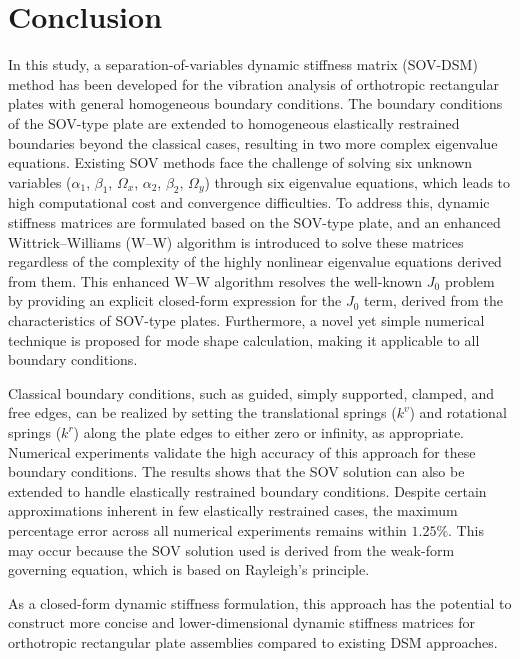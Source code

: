 \documentclass[preprint,12pt,number]{elsarticle}
\begin{document}
\section{Conclusion}\label{sec:coclusion}
In this study, a separation-of-variables dynamic stiffness matrix (SOV-DSM) method has been developed for the vibration analysis of orthotropic rectangular plates with general homogeneous boundary conditions. 
The boundary conditions of the SOV-type plate are extended to homogeneous elastically restrained boundaries beyond the classical cases, resulting in two more complex eigenvalue equations. 
Existing SOV methods face the challenge of solving six unknown variables ($\alpha_1$, $\beta_1$, $\Omega_x$, $\alpha_2$, $\beta_2$, $\Omega_y$) through six eigenvalue equations, which leads to high computational cost and convergence difficulties. 
To address this, dynamic stiffness matrices are formulated based on the SOV-type plate, and an enhanced Wittrick–Williams (W–W) algorithm is introduced to solve these matrices regardless of the complexity of the highly nonlinear eigenvalue equations derived from them. 
This enhanced W–W algorithm resolves the well-known $J_0$ problem by providing an explicit closed-form expression for the $J_0$ term, derived from the characteristics of SOV-type plates. 
Furthermore, a novel yet simple numerical technique is proposed for mode shape calculation, making it applicable to all boundary conditions.

Classical boundary conditions, such as guided, simply supported, clamped, and free edges, can be realized by setting the translational springs ($k^v$) and rotational springs ($k^r$) along the plate edges to either zero or infinity, as appropriate.  
Numerical experiments validate the high accuracy of this approach for these boundary conditions.  
The results shows that the SOV solution can also be extended to handle elastically restrained boundary conditions.
Despite certain approximations inherent in few elastically restrained cases, the maximum percentage error across all numerical experiments remains within $1.25\%$. 
This may occur because the SOV solution used is derived from the weak-form governing equation, which is based on Rayleigh's principle.  

As a closed-form dynamic stiffness formulation, this approach has the potential to construct more concise and lower-dimensional dynamic stiffness matrices for orthotropic rectangular plate assemblies compared to existing DSM approaches.
\end{document}
